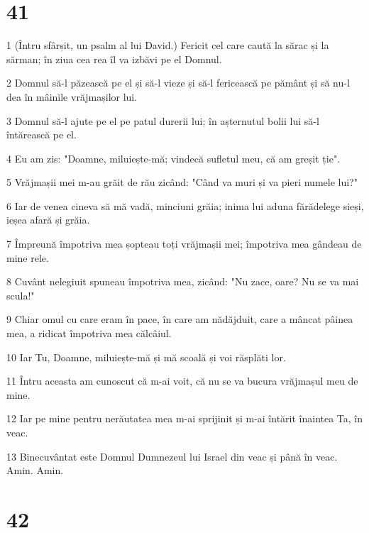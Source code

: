 \chapter{41}

\par 1 (Întru sfârșit, un psalm al lui David.) Fericit cel care caută la sărac și la sărman; în ziua cea rea îl va izbăvi pe el Domnul.
\par 2 Domnul să-l păzească pe el și să-l vieze și să-l fericească pe pământ și să nu-l dea în mâinile vrăjmașilor lui.
\par 3 Domnul să-l ajute pe el pe patul durerii lui; în așternutul bolii lui să-l întărească pe el.
\par 4 Eu am zis: "Doamne, miluiește-mă; vindecă sufletul meu, că am greșit ție".
\par 5 Vrăjmașii mei m-au grăit de rău zicând: "Când va muri și va pieri numele lui?"
\par 6 Iar de venea cineva să mă vadă, minciuni grăia; inima lui aduna fărădelege sieși, ieșea afară și grăia.
\par 7 Împreună împotriva mea șopteau toți vrăjmașii mei; împotriva mea gândeau de mine rele.
\par 8 Cuvânt nelegiuit spuneau împotriva mea, zicând: "Nu zace, oare? Nu se va mai scula!"
\par 9 Chiar omul cu care eram în pace, în care am nădăjduit, care a mâncat pâinea mea, a ridicat împotriva mea călcâiul.
\par 10 Iar Tu, Doamne, miluiește-mă și mă scoală și voi răsplăti lor.
\par 11 Întru aceasta am cunoscut că m-ai voit, că nu se va bucura vrăjmașul meu de mine.
\par 12 Iar pe mine pentru nerăutatea mea m-ai sprijinit și m-ai întărit înaintea Ta, în veac.
\par 13 Binecuvântat este Domnul Dumnezeul lui Israel din veac și până în veac. Amin. Amin.

\chapter{42}

